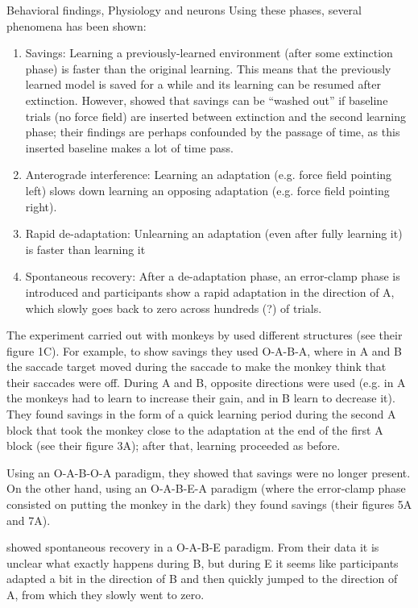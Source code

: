 \documentclass{report}
\begin{document}
\begin{chapter}{Behavioral findings, Physiology and neurons}
Using these phases, several phenomena has been shown:
\begin{enumerate}
\item Savings: Learning a previously-learned environment (after some extinction
phase) is faster than the original learning. This means that the previously
learned model is saved for a while and its learning can be resumed after
extinction. However, \cite{Kojima_Memory_2004} showed that savings can be
``washed out'' if baseline trials (no force field) are inserted between
extinction and the second learning phase; their findings are perhaps confounded
by the passage of time, as this inserted baseline makes a lot of time pass.
\item Anterograde interference: Learning an adaptation (e.g. force field
pointing left) slows down learning an opposing adaptation (e.g. force field
pointing right).
\item Rapid de-adaptation: Unlearning an adaptation (even after fully learning
it) is faster than learning it \citep{Davidson_Scaling_2004}
\item Spontaneous recovery: After a de-adaptation phase, an error-clamp phase
is introduced and participants show a rapid adaptation in the direction of A,
which slowly goes back to zero across hundreds (?) of trials.
\end{enumerate}

The experiment carried out with monkeys by \cite{Kojima_Memory_2004} used
different structures (see their figure 1C). For example, to show savings they
used O-A-B-A, where in A and B the saccade target moved during the saccade to
make the monkey think that their saccades were off. During A and B, opposite
directions were used (e.g. in A the monkeys had to learn to increase their
gain, and in B learn to decrease it). They found savings in the form of a quick
learning period during the second A block that took the monkey close to the
adaptation at the end of the first A block (see their figure 3A); after that,
learning proceeded as before.

Using an O-A-B-O-A paradigm, they showed that savings were no longer
present. On the other hand, using an O-A-B-E-A paradigm (where the error-clamp
phase consisted on putting the monkey in the dark) they found savings (their
figures 5A and 7A).

\cite{Smith_Interacting_2006} showed spontaneous recovery in a O-A-B-E
paradigm. From their data it is unclear what exactly happens during B, but
during E it seems like participants adapted a bit in the direction of B and
then quickly jumped to the direction of A, from which they slowly went to zero.


\end{chapter}
\end{document}
